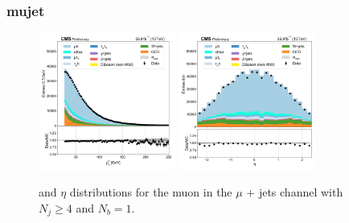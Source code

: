 \subsubsection{mujet}

\begin{figure}[htb!]
    \centering
    \includegraphics[width=0.4\textwidth]{chapters/Appendix/sectionPlots/figures/data_mc_overlays/mujet_2016_cat_gt4_eq1_signal_linear_lepton_lepton1_pt}
    \includegraphics[width=0.4\textwidth]{chapters/Appendix/sectionPlots/figures/data_mc_overlays/mujet_2016_cat_gt4_eq1_signal_linear_lepton_lepton1_eta}
    \caption{\pt and $\eta$ distributions for the muon in the $\mu$ + jets
    channel with $N_{j} \geq 4$ and $N_{b} = 1$.
    \label{fig:mujet_1_kinematic}}
\end{figure}

